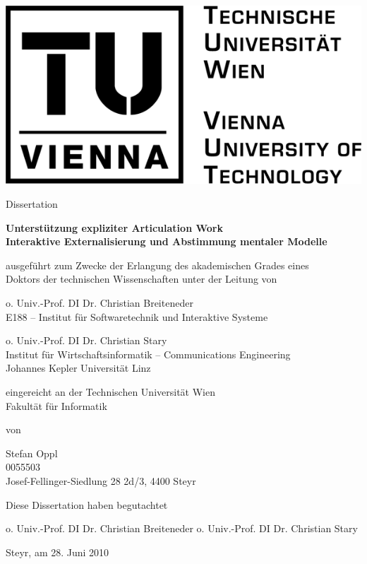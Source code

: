 \begin{titlepage}
	{
	\centering

	\includegraphics[width=.25\textwidth]{img/tu_logo.png}

	\vspace{1cm}

	\Large Dissertation
	
	\vspace{0.5cm}
	
	\textsf{
	\Large \textbf{Unterstützung expliziter Articulation Work}\\	
	\large \textbf{Interaktive Externalisierung und Abstimmung mentaler Modelle}
	}

	\vspace{1cm}
	
	\normalsize ausgeführt zum Zwecke der Erlangung des akademischen Grades eines\\Doktors der technischen Wissenschaften unter der Leitung von

	\vspace{0.2cm}
	
	o. Univ.-Prof. DI Dr. Christian Breiteneder\\\small E188 -- Institut für Softwaretechnik und Interaktive Systeme

	\vspace{0.2cm}

	\normalsize o. Univ.-Prof. DI Dr. Christian Stary\\\small Institut für Wirtschaftsinformatik -- Communications Engineering\\Johannes Kepler Universität Linz

	\vspace{0.4cm}

	\normalsize eingereicht an der Technischen Universität Wien\\Fakultät für Informatik

	\vspace{0.5cm}

	von

	\vspace{0.2cm}

	Stefan Oppl\\\small 0055503\\Josef-Fellinger-Siedlung 28 2d/3, 4400 Steyr
	
	\vspace{0.8cm}
	
	\normalsize Diese Dissertation haben begutachtet
	
	\vspace{1cm}
	\small o. Univ.-Prof. DI Dr. Christian Breiteneder \hspace{1cm} o. Univ.-Prof. DI Dr. Christian Stary

	\vspace{1.3cm}
	}
	\normalsize Steyr, am 28. Juni 2010
	
\end{titlepage}